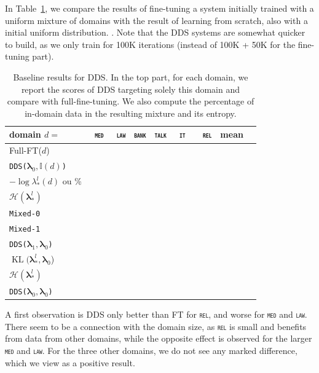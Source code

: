 \documentclass[11pt,a4paper]{article}
\newcommand{\fyTodo}[1]{\Todo[FY:]{\textcolor{orange}{#1}}}
\newcommand{\domain}[1]{\texttt{\textsc{#1}}}
\newcommand{\system}[1]{\texttt{{#1}}}
\newcommand{\vlambda}{\ensuremath{\boldsymbol\lambda}\xspace} %
\newcommand{\indic}[1]{\ensuremath{\mathbb{I}(#1)}}
\begin{document}
\fyTodo{Fix the table}
In Table~\ref{tab:finetuning}, we compare the results of fine-tuning a system initially trained with a uniform mixture\fyTodo{uniform or natural?} of domains with the result of learning from scratch, also with a initial uniform distribution. \fyTodo{What do we see ? How about domain proximity ? - show a graph}. Note that the DDS systems are somewhat quicker to build, as we only train for 100K iterations (instead of 100K + 50K for the fine-tuning part).

\begin{table}
  \centering \small
  \begin{tabular}{|l|*8{r|}} \hline
    domain \hfill $d=$ & \multicolumn{1}{c|}{\domain{ med}} & \multicolumn{1}{c|}{\domain{ law}} & \multicolumn{1}{c|}{\domain{bank}} & \multicolumn{1}{c|}{\domain{talk}} & \multicolumn{1}{c|}{\domain{ it }} & \multicolumn{1}{c|}{\domain{ rel}} & \multicolumn{1}{c|}{mean} \\ \hline
    Full-FT($d$) & \\
    \system{DDS($\vlambda_0, \indic{d}$)} & \\
    $- \log \lambda_*^{l}(d)$ ou \% & \\
    $ \mathcal{H}(\vlambda_*^{l})$ &  \\ \hline\hline
    \system{Mixed-0} & \\
    \system{Mixed-1} & \\
    \system{DDS($\vlambda_1, \vlambda_0$)} & \\
    $\operatorname{KL}(\vlambda_*^{l}, \vlambda_0$) & \\
     $ \mathcal{H}(\vlambda_*^{l})$ &  \\
    \system{DDS($\vlambda_0, \vlambda_0$)} & \\ \hline
  \end{tabular}
  \caption{Baseline results for DDS. In the top part, for each domain, we report the scores of DDS targeting solely this domain and compare with full-fine-tuning. We also compute the percentage of in-domain data in the resulting mixture and its entropy.}
  \label{tab:finetuning}
\end{table}

A first observation is DDS only better than FT for \domain{rel}, and worse for \domain{med} and \domain{law}. There seem to be a connection with the domain size, as \domain{rel} is small and benefits from data from other domains, while the opposite effect is observed for the larger \domain{med} and \domain{law}. For the three other domains, we do not see any marked difference, which we view as a positive result.
\end{document}
